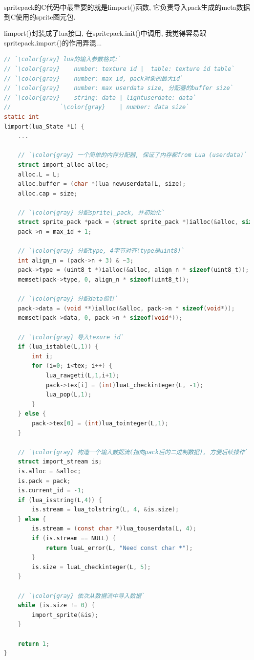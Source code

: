 {spritepack的C代码中最重要的就是limport()函数, 它负责导入pack生成的meta数据到C使用的sprite图元包.}\par
{limport()封装成了lua接口, 在spritepack.init()中调用, 我觉得容易跟spritepack.import()的作用弄混... }\par
\begin{lstlisting}[language=C]
// `\color{gray} lua的输入参数格式:`
// `\color{gray}    number: texture id |  table: texture id table`
// `\color{gray}    number: max id, pack对象的最大id`
// `\color{gray}    number: max userdata size, 分配器的buffer size`
// `\color{gray}    string: data | lightuserdate: data`
//              `\color{gray}    | number: data size`
static int
limport(lua_State *L) {
    ...

    // `\color{gray} 一个简单的内存分配器, 保证了内存都from Lua (userdata)`
    struct import_alloc alloc;
    alloc.L = L;
    alloc.buffer = (char *)lua_newuserdata(L, size);
    alloc.cap = size;
   
    // `\color{gray} 分配sprite\_pack, 并初始化`
    struct sprite_pack *pack = (struct sprite_pack *)ialloc(&alloc, sizeof(*pack) + (tex - 1) * sizeof(int));
    pack->n = max_id + 1;

    // `\color{gray} 分配type, 4字节对齐(type是uint8)`
    int align_n = (pack->n + 3) & ~3;
    pack->type = (uint8_t *)ialloc(&alloc, align_n * sizeof(uint8_t));
    memset(pack->type, 0, align_n * sizeof(uint8_t));
    
    // `\color{gray} 分配data指针`
    pack->data = (void **)ialloc(&alloc, pack->n * sizeof(void*));
    memset(pack->data, 0, pack->n * sizeof(void*));

    // `\color{gray} 导入texure id`
    if (lua_istable(L,1)) {
        int i;
        for (i=0; i<tex; i++) {
            lua_rawgeti(L,1,i+1);
            pack->tex[i] = (int)luaL_checkinteger(L, -1);
            lua_pop(L,1);
        }
    } else {
        pack->tex[0] = (int)lua_tointeger(L,1);
    }

    // `\color{gray} 构造一个输入数据流(指向pack后的二进制数据), 方便后续操作`
    struct import_stream is;
    is.alloc = &alloc;
    is.pack = pack;
    is.current_id = -1;
    if (lua_isstring(L,4)) {
        is.stream = lua_tolstring(L, 4, &is.size);
    } else {
        is.stream = (const char *)lua_touserdata(L, 4);
        if (is.stream == NULL) {
            return luaL_error(L, "Need const char *");
        }
        is.size = luaL_checkinteger(L, 5);
    }

    // `\color{gray} 依次从数据流中导入数据`
    while (is.size != 0) {
        import_sprite(&is);
    }

    return 1;
}
\end{lstlisting}

